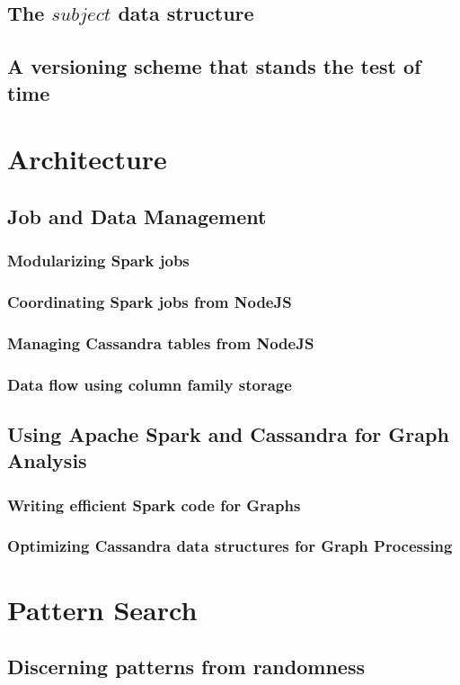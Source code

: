 \documentclass[
        a4paper,     %
        titlepage,   %
        twoside,     %
        parskip      %
        ]{scrartcl}  %
\begin{document}
    \subsection{The $subject$ data structure}
    \subsection{A versioning scheme that stands the test of time}
  \section{Architecture}
    \subsection{Job and Data Management}
      \subsubsection{Modularizing Spark jobs}
      \subsubsection{Coordinating Spark jobs from NodeJS}
      \subsubsection{Managing Cassandra tables from NodeJS}
      \subsubsection{Data flow using column family storage}
    \subsection{Using Apache Spark and Cassandra for Graph Analysis}
      \subsubsection{Writing efficient Spark code for Graphs}
      \subsubsection{Optimizing Cassandra data structures for Graph Processing}
  \section{Pattern Search}
    \subsection{Discerning patterns from randomness}
\end{document}
